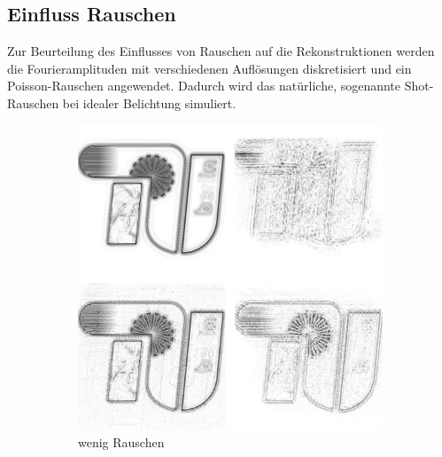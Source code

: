\subsection{Einfluss Rauschen}
Zur Beurteilung des Einflusses von Rauschen auf die Rekonstruktionen werden die Fourieramplituden mit verschiedenen Auflösungen diskretisiert und ein Poisson-Rauschen angewendet. Dadurch wird das natürliche, sogenannte Shot-Rauschen bei idealer Belichtung simuliert.
\begin{figure}
	\begin{subfigure}[b]{0.45\textwidth}
		\includegraphics[width=\textwidth]{images/recon2d-mask16bit16.png}
		\caption{wenig Rauschen}
	\end{subfigure}
	\hspace*{\fill}
	\begin{subfigure}[b]{0.45\textwidth}

\end{subfigure}
\end{figure}
